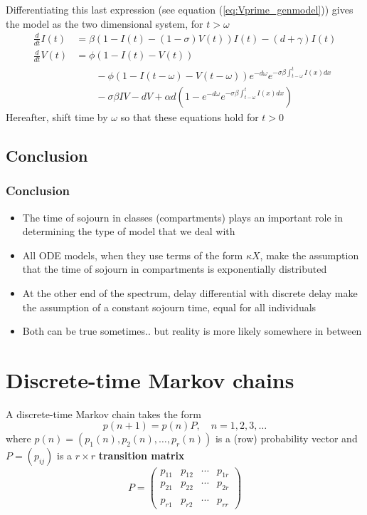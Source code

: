 \documentclass[aspectratio=43]{beamer}
\begin{document}
\begin{frame}
Differentiating this last expression (see equation
(\ref{eq:Vprime_genmodel})) gives the model as the two
dimensional system, for $t>\omega$
\begin{align*}
  \frac{d}{dt}I(t) &= 
  \beta(1-I(t)-(1-\sigma)V(t))I(t)-(d+\gamma)I(t) \\
  \frac{d}{dt}V(t) &=
  \phi(1-I(t)-V(t)) \\
  &\qquad-\phi(1-I(t-\omega)-V(t-\omega))e^{-d\omega}
  e^{-\sigma\beta\int_{t-\omega}^t I(x)dx} \\
  &\qquad -\sigma\beta IV-dV
  +\alpha d\left(1-e^{-d\omega}e^{-\sigma\beta\int_{t-\omega}^t I(x)dx}
  \right)
\end{align*}
Hereafter, shift time by $\omega$ so that these equations hold for $t>0$
\end{frame}




\subsection{Conclusion}

\begin{frame}\frametitle{Conclusion}
\begin{itemize}
\item The time of sojourn in classes (compartments) plays an important role in determining the type of model that we deal with
\vfill
\item All ODE models, when they use terms of the form $\kappa X$, make the assumption that the time of sojourn in compartments is exponentially distributed
\vfill
\item At the other end of the spectrum, delay differential with discrete delay make the assumption of a constant sojourn time, equal for all individuals
\vfill
\item Both can be true sometimes.. but reality is more likely somewhere in between
\end{itemize}
\end{frame}

\section{Discrete-time Markov chains}

\begin{frame}
A discrete-time Markov chain takes the form
\[
p(n+1)=p(n)P, \quad n=1,2,3,\dots
\]
where $p(n)=(p_1(n),p_{2}(n),\dots , p_r(n))$ is a (row) probability vector and $P=(p_{ij})$ is a $r\times r$ \textbf{transition matrix}
\[
P=
\begin{pmatrix}
p_{11} & p_{12} & \cdots & p_{1r} \\
p_{21} & p_{22} & \cdots & p_{2r} \\
&&& \\
p_{r1} & p_{r2} & \cdots & p_{rr}
\end{pmatrix}
\]
\end{frame}
\end{document}
